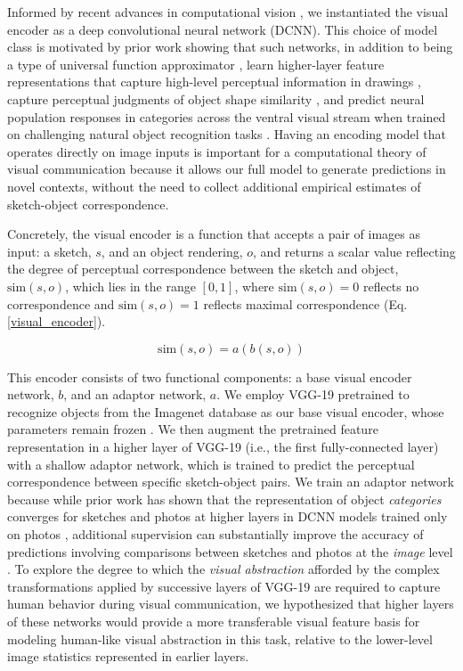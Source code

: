\documentclass[9pt,twocolumn,twoside]{pnas-new}
\begin{document}
Informed by recent advances in computational vision \cite{FanCommon2018,yamins2014performance}, we instantiated the visual encoder as a deep convolutional neural network (DCNN). 
This choice of model class is motivated by prior work showing that such networks, in addition to being a type of universal function approximator \cite{hornik1991approximation}, learn higher-layer feature representations that capture high-level perceptual information in drawings \cite{FanCommon2018}, capture perceptual judgments of object shape similarity \cite{kubilius2016deep}, and predict neural population responses in categories across the ventral visual stream \cite{yamins2014performance} when trained on challenging natural object recognition tasks \cite{deng2009imagenet}. 
Having an encoding model that operates directly on image inputs is important for a computational theory of visual communication because it allows our full model to generate predictions in novel contexts, without the need to collect additional empirical estimates of sketch-object correspondence.

Concretely, the visual encoder is a function that accepts a pair of images as input: a sketch, $s$, and an object rendering, $o$, and returns a scalar value reflecting the degree of perceptual correspondence between the sketch and object, $\textrm{sim}(s,o)$, which lies in the range $[0,1]$, where $\textrm{sim}(s,o)=0$ reflects no correspondence and $\textrm{sim}(s,o)=1$ reflects maximal correspondence (Eq. \ref{visual_encoder}).

\begin{equation}
\label{visual_encoder}
\textrm{sim}(s,o) = a(b(s,o))
\end{equation}

This encoder consists of two functional components: a base visual encoder network, $b$, and an adaptor network, $a$. 
We employ VGG-19 pretrained to recognize objects from the Imagenet database as our base visual encoder, whose parameters remain frozen \cite{simonyan2014very}. 
We then augment the pretrained feature representation in a higher layer of VGG-19 (i.e., the first fully-connected layer) with a shallow adaptor network, which is trained to predict the perceptual correspondence between specific sketch-object pairs. 
We train an adaptor network because while prior work has shown that the representation of object \textit{categories} converges for sketches and photos at higher layers in DCNN models trained only on photos \cite{FanCommon2018}, additional supervision can substantially improve the accuracy of predictions involving comparisons between sketches and photos at the \textit{image} level \cite{sangkloy2016sketchy}. 
To explore the degree to which the \textit{visual abstraction} afforded by the complex transformations applied by successive layers of VGG-19 are required to capture human behavior during visual communication, we hypothesized that higher layers of these networks would provide a more transferable visual feature basis for modeling human-like visual abstraction in this task, relative to the lower-level image statistics represented in earlier layers.
\end{document}
